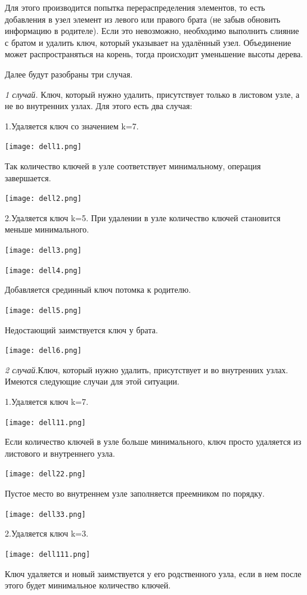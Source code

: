 \documentclass{article}
\begin{document}
  Для этого производится попытка перераспределения элементов, то есть добавления в узел элемент из левого или правого брата (не забыв обновить информацию в родителе). Если это невозможно, необходимо выполнить слияние с братом и удалить ключ, который указывает на удалённый узел. Объединение может распространяться на корень, тогда происходит уменьшение высоты дерева.

   Далее будут разобраны три случая.

   \textit{1 случай.} Ключ, который нужно удалить, присутствует только в листовом узле, а не во внутренних узлах. Для этого есть два случая:
   
   1.Удаляется ключ со значением k=7. 

   \texttt{[image: dell1.png]}

   Так количество ключей в узле соответствует минимальному, операция завершается.
   
   \texttt{[image: dell2.png]}

   2.Удаляется ключ k=5. При удалении в узле количество ключей становится меньше минимального.
   
      \texttt{[image: dell3.png]}
      
      \texttt{[image: dell4.png]}

  Добавляется срединный ключ потомка к родителю.

      \texttt{[image: dell5.png]}

    Недостающий заимствуется ключ у брата. 

       \texttt{[image: dell6.png]}

   
   

   \textit{2 случай.}Ключ, который нужно удалить, присутствует и во внутренних узлах. Имеются следующие случаи для этой ситуации.
   
   1.Удаляется ключ k=7.

   \texttt{[image: dell11.png]}
   
   Если количество ключей в узле больше минимального, ключ просто удаляется из листового и внутреннего узла.

   \texttt{[image: dell22.png]}
   
Пустое место во внутреннем узле заполняется преемником по порядку.

\texttt{[image: dell33.png]}

2.Удаляется ключ k=3.

\texttt{[image: dell111.png]}

Ключ удаляется и новый заимствуется у его родственного узла, если в нем после этого будет минимальное количество ключей.
\end{document}
